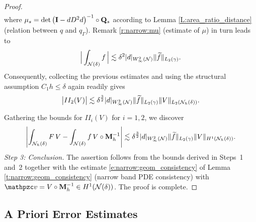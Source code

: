 \begin{proof}
\[\begin{aligned}
\end{aligned}
\]
%
where $\mu_s = \det \big( {\bf I} - d D^2 d \big)^{-1} \circ {\mathbf{Q}_s}$ according to
Lemma \ref{L:area_ratio_distance} (relation between $q$ and $q_\Gamma$).
Remark \ref{r:narrow:mu} (estimate of $\mu$) in turn leads to
%
\[
\Big| \int_{\mathcal{N}(\delta)} f \, \Big| \lesssim \delta^{2} |d|_{W^2_\infty(\mathcal{N})} \|\widetilde{f}\|_{L_2(\gamma)}.  
\]
%
%
Consequently, collecting the previous estimates and using the structural assumption $C_1h \le \delta$ again readily gives
%
\[
\big| II_2(V) \big| \lesssim \delta^{\frac32} |d|_{W^2_\infty(\mathcal{N})}
\|\widetilde{f}\|_{L_2(\gamma)} \|V\|_{L_2({\mathcal{N}_h(\delta)})}.
\]
% 

Gathering the bounds for $II_i(V)$ for $i=1,2$, we discover
$$
\left| \int_{\mathcal{N}_h(\delta)} F \, V - \int_{\mathcal{N}(\delta)} f \, V\circ{\bf M}_h^{-1}\right| \lesssim  \delta^{\frac32}
|d|_{W^2_\infty(\mathcal{N})} \|\widetilde{f}\|_{L_2(\gamma)} \|V\|_{H^1({\mathcal{N}_h(\delta)})}.
$$
{\it Step 3: Conclusion.}
The assertion follows from the bounds derived in Steps~1 and~2 together with the estimate \eqref{e:narrow:geom_consistency} of Lemma \ref{t:narrow:geom_consistency} (narrow band PDE consistency) with $\tv =V\circ \bM_h^{-1} \in H^1(\mathcal N(\delta))$. The proof is complete.
\end{proof}

\subsection{A Priori Error Estimates}

